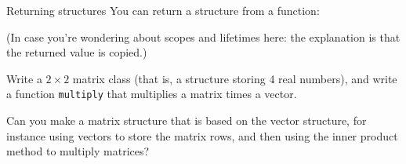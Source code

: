 \begin{block}{Returning structures}
  \label{sl:struct-return}
  You can return a structure from a function:

  (In case you're wondering about scopes and lifetimes here: the
  explanation is that the returned value is copied.)
\end{block}

\begin{exercise}
  \label{ex:matstruct}
  Write a $2\times 2$ matrix class (that is, a structure storing 4
  real numbers), and write a function \lstinline$multiply$
  that multiplies a matrix times a vector.

  Can you make a matrix structure that is based on the vector
  structure, for instance using vectors to store the matrix rows, and
  then using the inner product method to multiply matrices?
\end{exercise}

